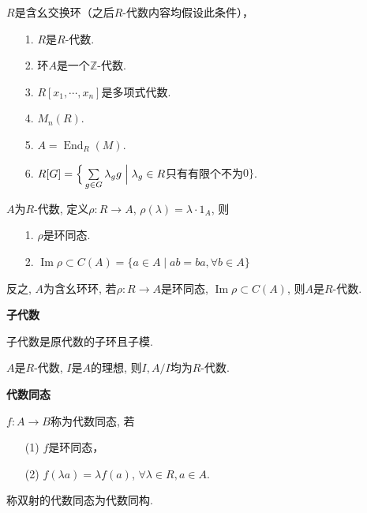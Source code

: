 \begin{example} $R$是含幺交换环（之后$R$-代数内容均假设此条件），\par
    \begin{itemize}
        \item[1.] $R$是$R$-代数.
        \item[2.] 环$A$是一个$\mathbb{Z}$-代数.
        \item[3.] $R[x_1,\cdots,x_n]$是多项式代数.
        \item[4.] $M_n(R)$.
        \item[5.] $A=\operatorname{End}_R(M)$.
        \item[6.] $R[G]=\Big\{\sum\limits_{g\in G} \lambda_g g\Bigm| \lambda_g\in R$只有有限个不为$0\Big\}$.
    \end{itemize}
\end{example}

\begin{proposition}
    $A$为$R$-代数, 定义$\rho:R\rightarrow A$, $\rho(\lambda)=\lambda\cdot 1_A$, 则
        \begin{itemize}
            \item[1.] $\rho$是环同态.
            \item[2.] $\operatorname{Im} \rho \subset C(A)=\{a\in A\mid ab=ba, \forall b\in A\}$
        \end{itemize}
\end{proposition}

\begin{proposition}
    反之, $A$为含幺环环, 若$\rho:R\rightarrow A$是环同态, 
    $\operatorname{Im} \rho\subset C(A)$, 则$A$是$R$-代数.
\end{proposition}

\begin{definition}\textbf{子代数}\par
    子代数是原代数的子环且子模.

\end{definition}

\begin{proposition}
    $A$是$R$-代数, $I$是$A$的理想, 则$I,A/I$均为$R$-代数.
\end{proposition}

\begin{definition} \textbf{代数同态}\par
    $f:A\rightarrow B$称为代数同态, 若
        \begin{itemize}
            \item[(1)] $f$是环同态，
            \item[(2)] $f(\lambda a)=\lambda f(a)$, 
            $\forall \lambda\in R, a\in A$.
        \end{itemize}
    称双射的代数同态为代数同构.
\end{definition}

